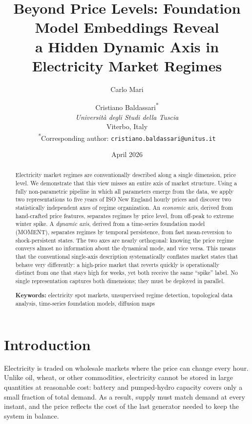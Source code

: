 \documentclass[12pt]{article}
\title{Beyond Price Levels: Foundation Model Embeddings Reveal\\a Hidden Dynamic Axis in Electricity Market Regimes}
\author{
  Carlo Mari \and
  Cristiano Baldassari\textsuperscript{*} \\[0.5em]
  \textit{Universit\`a degli Studi della Tuscia} \\
  Viterbo, Italy \\[0.3em]
  \textsuperscript{*}Corresponding author: \texttt{cristiano.baldassari@unitus.it}
}
\date{April 2026} %
\begin{document}
\maketitle

\begin{abstract}
Electricity market regimes are conventionally described along a single dimension, price level.
We demonstrate that this view misses an entire axis of market structure.
Using a fully non-parametric pipeline in which all parameters emerge from the data, we apply two representations to five years of ISO New England hourly prices and discover two statistically independent axes of regime organization.
An \emph{economic axis}, derived from hand-crafted price features, separates regimes by price level, from off-peak to extreme winter spike.
A \emph{dynamic axis}, derived from a time-series foundation model (MOMENT), separates regimes by temporal persistence, from fast mean-reversion to shock-persistent states.
The two axes are nearly orthogonal: knowing the price regime conveys almost no information about the dynamical mode, and vice versa.
This means that the conventional single-axis description systematically conflates market states that behave very differently: a high-price market that reverts quickly is operationally distinct from one that stays high for weeks, yet both receive the same ``spike'' label.
No single representation captures both dimensions; they must be deployed in parallel.

\medskip
\noindent\textbf{Keywords:} electricity spot markets, unsupervised regime detection, topological data analysis, time-series foundation models, diffusion maps
\end{abstract}

\newpage

\section{Introduction}
\label{sec:introduction}


Electricity is traded on wholesale markets where the price can change every hour.
Unlike oil, wheat, or other commodities, electricity cannot be stored in large quantities at reasonable cost: battery and pumped-hydro capacity covers only a small fraction of total demand.
As a result, supply must match demand at every instant, and the price reflects the cost of the last generator needed to keep the system in balance.
\end{document}
